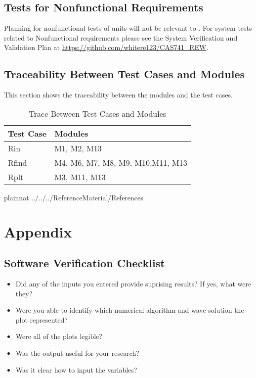 \documentclass[12pt, titlepage]{article}
\begin{document}
\subsection{Tests for Nonfunctional Requirements}

Planning for nonfunctional tests of units will not be relevant to \progname. 
For system tests related to Nonfunctional requirements please see the System 
Verification and Validation Plan at 
\url{https://github.com/whitere123/CAS741_REW}. 

\subsection{Traceability Between Test Cases and Modules}

This section shows the traceability between the modules and the test cases.

\begin{table}[H]
	\centering
	\begin{tabular}{p{} p{}}
		\toprule
		\textbf{Test Case} & \textbf{Modules}\\
		\midrule
			Rin & M1, M2, M13\\
			Rfind & M4, M6, M7, M8, M9, M10,M11, M13\\
			Rplt & M3, M11, M13 \\
		\bottomrule
	\end{tabular}
	\caption{Trace Between Test Cases and Modules}
	\label{TblRT}
\end{table}

\clearpage
 {plainnat}
 {../../../ReferenceMaterial/References}

\newpage

\section{Appendix} 
\label{app}

\subsection{Software Verification Checklist} 
\label{softwarevercheck}
\begin{itemize}
	\item Did any of the inputs you entered provide suprising results? If yes, 
	what were they?
	\item Were you able to identify which numerical algorithm and wave solution 
	the plot represented? 
	\item Were all of the plots legible? 
	\item Was the output useful for your research? 
	\item Was it clear how to input the variables? 
\end{itemize}  
\end{document}
